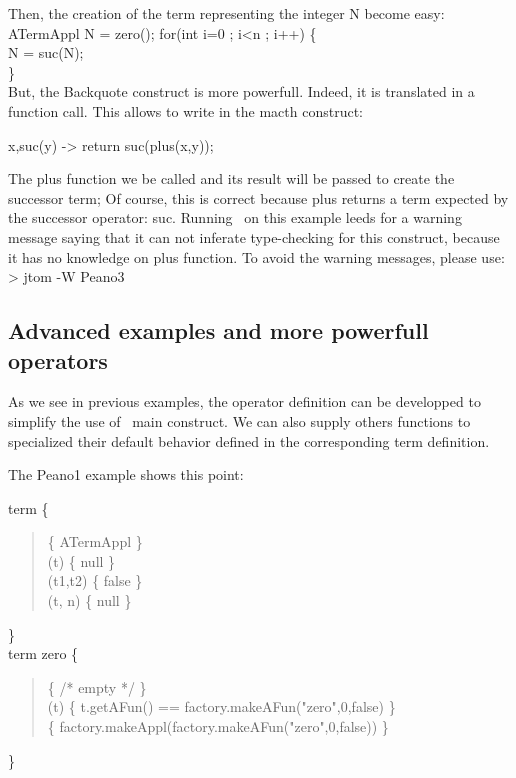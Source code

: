 Then, the creation of the term representing the integer N become easy:\\
ATermAppl N = \backquote zero();
for(int i=0 ; i<n ; i++) \{\\
  N = \backquote suc(N);\\
\}\\

But, the Backquote construct is more powerfull. Indeed, it is
translated in a function call. This allows to write in the macth
construct:

x,suc(y) -> { return \backquote suc(plus(x,y)); }

The plus function we be called and its result will be passed to create
the successor term; Of course, this is correct because plus returns a
term expected by the successor operator: suc. Running \TOM\ on this
example leeds for a warning message saying that it can not inferate
type-checking for this construct, because it has no knowledge on plus
function. To avoid the warning messages, please use:
\\> jtom -W Peano3

\subsection{Advanced examples and more powerfull operators}
As we see in previous examples, the operator definition can be
developped to simplify the use of \TOM\ main construct. We can also
supply others functions to specialized their default behavior defined
in the corresponding term definition.

The Peano1 example shows this point:

\typeterm term \{\\
\begin{quote}
  \implement           \{ ATermAppl \}\\
  \getfs(t)      \{ null \}\\
  \cmpfs(t1,t2)  \{ false \}\\
  \getsub(t, n)   \{ null \}\\
\end{quote}
\}\\

\op term zero \{\\
\begin{quote}
  \fsym       \{ \textsf{/* empty */} \}\\
  \isfs(t) \{ t.getAFun() == factory.makeAFun("zero",0,false) \}\\
  \make       \{ factory.makeAppl(factory.makeAFun("zero",0,false)) \}\\
\end{quote}
\}\\
  
